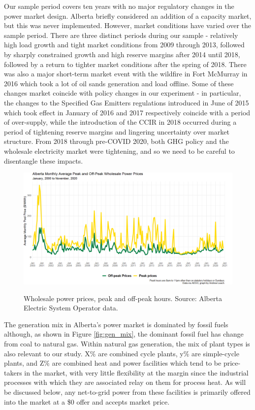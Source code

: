 \documentclass[12pt]{article}
\begin{document}
Our sample period covers ten years with no major regulatory changes in the power market design. Alberta briefly considered an addition of a capacity market, but this was never implemented. However, market conditions have varied over the sample period. There are three distinct periods during our sample - relatively high load growth and tight market conditions from 2009 through 2013, followed by sharply constrained growth and high reserve margins after 2014 until 2018, followed by a return to tighter market conditions after the spring of 2018. There was also a major short-term market event with the wildfire in Fort McMurray in 2016 which took a lot of oil sands generation and load offline. Some of these changes market coincide with policy changes in our experiment - in particular, the changes to the Specified Gas Emitters regulations introduced in June of 2015 which took effect in January of 2016 and 2017 respectively coincide with a period of over-supply, while the introduction of the CCIR in 2018 occurred during a period of tightening reserve margins and lingering uncertainty over market structure. From 2018 through pre-COVID 2020, both GHG policy and the wholesale electricity market were tightening, and so we need to be careful to disentangle these impacts.

\begin{figure}[!h]%
	\centering \vspace{-.25cm} \includegraphics[width=6.5in]{../images/peak_prices_2000_2020.png}
\label{fig:prices}
\vspace{-0.75cm}	\caption{Wholesale power prices, peak and off-peak hours.  Source: Alberta Electric System Operator data.}
\end{figure}

The generation mix in Alberta's power market is dominated by fossil fuels although, as shown in Figure \ref{fig:gen_mix}, the dominant fossil fuel has change from coal to natural gas. Within natural gas generation, the mix of plant types is also relevant to our study. X\% are combined cycle plants, y\% are simple-cycle plants, and Z\% are combined heat and power facilities which tend to be price-takers in the market, with very little flexibility at the margin since the industrial processes with which they are associated relay on them for process heat. As will be discussed below, any net-to-grid power from these facilities is primarily offered into the market at a \$0 offer and accepts market price.
\end{document}
